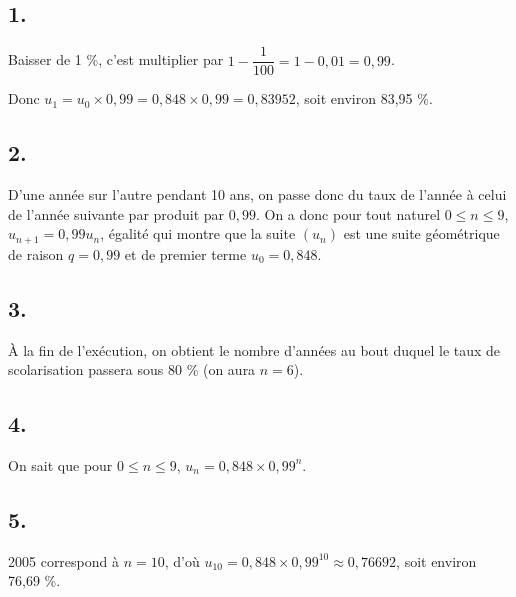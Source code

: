 \subsection*{1.}

Baisser de 1 \%, c'est multiplier par \(1 - \dfrac{1}{100} = 1 - 0{,}01 = 0{,}99\).

Donc \( u_1 = u_0 \times 0{,}99 = 0{,}848 \times 0{,}99 = 0{,}83952 \), soit environ 83{,}95 \%.

\subsection*{2.}

D'une année sur l'autre pendant 10 ans, on passe donc du taux de l'année à celui de l'année suivante par produit par \(0{,}99\). On a donc pour tout naturel \( 0 \leqslant n \leqslant 9 \), \( u_{n+1} = 0{,}99 u_n \), égalité qui montre que la suite \( (u_n) \) est une suite géométrique de raison \(q = 0{,}99\) et de premier terme \( u_0 = 0{,}848 \).

\subsection*{3.}

À la fin de l'exécution, on obtient le nombre d'années au bout duquel le taux de scolarisation passera sous 80 \% (on aura \( n = 6 \)).

\subsection*{4.}

On sait que pour \( 0 \leqslant n \leqslant 9 \), \( u_n = 0{,}848 \times 0{,}99^n \).

\subsection*{5.}

2005 correspond à \( n = 10 \), d'où \( u_{10} = 0{,}848 \times 0{,}99^{10} \approx 0{,}76692 \), soit environ 76{,}69 \%.
